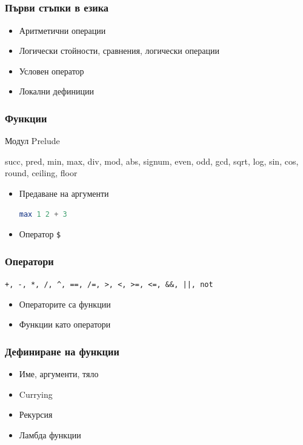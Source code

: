 \documentclass{beamer}
\begin{document}
\subsection{}

\begin{frame}[fragile]
  \frametitle{Първи стъпки в езика}
  \begin{itemize}
    \item Аритметични операции
    \item Логически стойности, сравнения, логически операции
    \item Условен оператор
    \item Локални дефиниции
  \end{itemize}
\end{frame}

\begin{frame}[fragile]
  \frametitle{Функции}

  Модул Prelude

  \bigskip

  succ, pred, min, max, div, mod, abs, signum, even, odd, gcd, sqrt, log, sin, cos, round, ceiling, floor

  \bigskip

  \begin{itemize}
    \item Предаване на аргументи
    \begin{lstlisting}[basicstyle=\small, language=Haskell]
    max 1 2 + 3
    \end{lstlisting}
    \item Оператор \verb|$|
  \end{itemize}
\end{frame}


\begin{frame}[fragile]
  \frametitle{Оператори}

  \verb#+, -, *, /, ^, ==, /=, >, <, >=, <=, &&, ||, not#

  \bigskip

  \begin{itemize}
    \item Операторите са функции
    \item Функции като оператори
  \end{itemize}
\end{frame}


\begin{frame}[fragile]
  \frametitle{Дефиниране на функции}

  \begin{itemize}
    \item Име, аргументи, тяло
    \item Currying
    \item Рекурсия
    \item Ламбда функции
  \end{itemize}
\end{frame}
\end{document}
